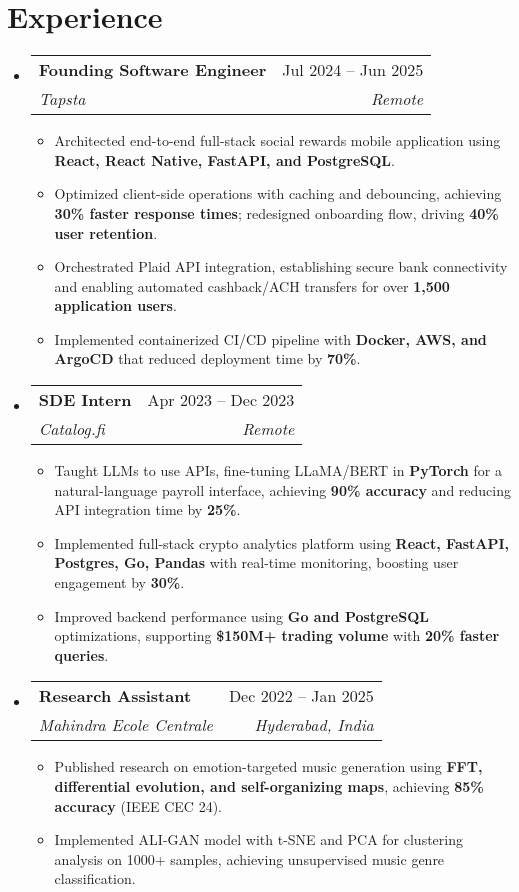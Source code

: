 \documentclass[a4paper,11pt]{article}
\makeatletter
\newcommand{\resumeItem}[1]{
  \item\small{#1}
}
\newcommand{\resumeItemListStart}{\begin{itemize}[rightmargin=0.11in]}
\newcommand{\resumeItemListEnd}{\end{itemize}}
\newcommand{\resumeQuadHeading}[4]{
  \item
  \begin{tabular*}{0.96\textwidth}[t]{l@{\extracolsep{\fill}}r}
    \textbf{#1} & #2 \\
    \textit{\small#3} & \textit{\small #4} \\
  \end{tabular*}
}
\newcommand{\resumeHeadingListStart}{
  \begin{itemize}[leftmargin=0.15in, label={}]
}
\newcommand{\resumeHeadingListEnd}{\end{itemize}}
\makeatother
\begin{document}

\section{Experience}
\resumeHeadingListStart{}
  \resumeQuadHeading{Founding Software Engineer}{Jul 2024 -- Jun 2025}
  {Tapsta}{Remote}
    \resumeItemListStart{}
      \resumeItem{Architected end-to-end full-stack social rewards mobile application using \textbf{React, React Native, FastAPI, and PostgreSQL}.}
      \resumeItem{Optimized client-side operations with caching and debouncing, achieving \textbf{30\% faster response times}; redesigned onboarding flow, driving \textbf{40\% user retention}.}
      \resumeItem{Orchestrated Plaid API integration, establishing secure bank connectivity and enabling automated cashback/ACH transfers for over \textbf{1,500 application users}.}
      \resumeItem{Implemented containerized CI/CD pipeline with \textbf{Docker, AWS, and ArgoCD} that reduced deployment time by \textbf{70\%}.}
    \resumeItemListEnd{}

  \resumeQuadHeading{SDE Intern}{Apr 2023 -- Dec 2023}
  {Catalog.fi}{Remote}
    \resumeItemListStart{}
      \resumeItem{Taught LLMs to use APIs, fine-tuning LLaMA/BERT in \textbf{PyTorch} for a natural-language payroll interface, achieving \textbf{90\% accuracy} and reducing API integration time by \textbf{25\%}.}
      \resumeItem{Implemented full-stack crypto analytics platform using \textbf{React, FastAPI, Postgres, Go, Pandas} with real-time monitoring, boosting user engagement by \textbf{30\%}.}
      \resumeItem{Improved backend performance using \textbf{Go and PostgreSQL} optimizations, supporting \textbf{\$150M+ trading volume} with \textbf{20\% faster queries}.}
    \resumeItemListEnd{}

  \resumeQuadHeading{Research Assistant}{Dec 2022 -- Jan 2025}
  {Mahindra Ecole Centrale}{Hyderabad, India}
    \resumeItemListStart{}
      \resumeItem{Published research on emotion-targeted music generation using \textbf{FFT, differential evolution, and self-organizing maps}, achieving \textbf{85\% accuracy} (IEEE CEC 24).}
      \resumeItem{Implemented ALI-GAN model with t-SNE and PCA for clustering analysis on 1000+ samples, achieving unsupervised music genre classification.}
    \resumeItemListEnd{}
\resumeHeadingListEnd{}
\end{document}
